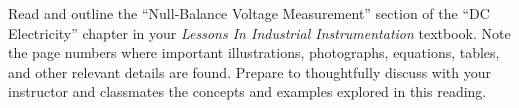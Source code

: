 

Read and outline the ``Null-Balance Voltage Measurement'' section of the ``DC Electricity'' chapter in your {\it Lessons In Industrial Instrumentation} textbook.  Note the page numbers where important illustrations, photographs, equations, tables, and other relevant details are found.  Prepare to thoughtfully discuss with your instructor and classmates the concepts and examples explored in this reading.
















